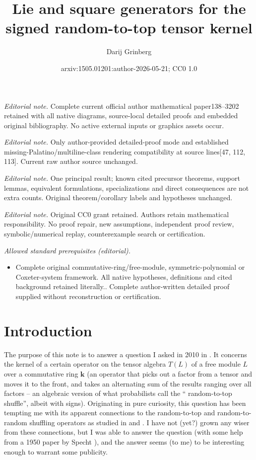 \documentclass[numbers=enddot,12pt,final,onecolumn,notitlepage]{scrartcl}%
\title{Lie and square generators for the signed random-to-top tensor kernel}
\author{Darij Grinberg}
\date{arxiv:1505.01201:author-2026-05-21; CC0 1.0}
\theoremstyle{definition}
\begin{document}
\maketitle
\noindent\textit{Editorial note.} Complete current official author mathematical paper138--3202 retained with all native diagrams, source-local detailed proofs and embedded original bibliography. No active external inputs or graphics assets occur.\par\medskip
\noindent\textit{Editorial note.} Only author-provided detailed-proof mode and established missing-Palatino/multiline-class rendering compatibility at source lines[47, 112, 113]. Current raw author source unchanged.\par\medskip
\noindent\textit{Editorial note.} One principal result; known cited precursor theorems, support lemmas, equivalent formulations, specializations and direct consequences are not extra counts. Original theorem/corollary labels and hypotheses unchanged.\par\medskip
\noindent\textit{Editorial note.} Original CC0 grant retained. Authors retain mathematical responsibility. No proof repair, new assumptions, independent proof review, symbolic/numerical replay, counterexample search or certification.\par\medskip
\noindent\textit{Allowed standard prerequisites (editorial).}\begin{itemize}
\item Complete original commutative-ring/free-module, symmetric-polynomial or Coxeter-system framework. All native hypotheses, definitions and cited background retained literally.. Complete author-written detailed proof supplied without reconstruction or certification.
\end{itemize}\medskip
\section{Introduction}

The purpose of this note is to answer a question I asked in 2010 in \cite{mo}.
It concerns the kernel of a certain operator on the tensor algebra $T\left(
L\right)  $ of a free module $L$ over a commutative ring $\mathbf{k}$ (an
operator that picks out a factor from a tensor and moves it to the front, and
takes an alternating sum of the results ranging over all factors -- an
algebraic version of what probabilists call the \textquotedblleft
random-to-top shuffle\textquotedblright, albeit with signs). Originating in
pure curiosity, this question has been tempting me with its apparent
connections to the random-to-top and random-to-random shuffling operators as
studied in \cite{rsw} and \cite{schocker}. I have not (yet?) grown any wiser
from these connections, but I was able to answer the question (with some help
from a 1950 paper by Specht \cite{specht}), and the answer seems (to me) to be
interesting enough to warrant some publicity.
\end{document}
